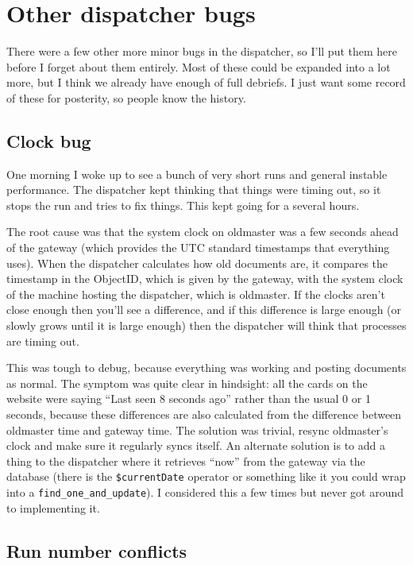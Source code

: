 \chapter{Other dispatcher bugs}

There were a few other more minor bugs in the dispatcher, so I'll put them here before I forget about them entirely.
Most of these could be expanded into a lot more, but I think we already have enough of full debriefs.
I just want some record of these for posterity, so people know the history.

\section{Clock bug}

One morning I woke up to see a bunch of very short runs and general instable performance.
The dispatcher kept thinking that things were timing out, so it stops the run and tries to fix things.
This kept going for a several hours.

The root cause was that the system clock on oldmaster was a few seconds ahead of the gateway (which provides the UTC standard timestamps that everything uses).
When the dispatcher calculates how old documents are, it compares the timestamp in the ObjectID, which is given by the gateway, with the system clock of the machine hosting the dispatcher, which is oldmaster.
If the clocks aren't close enough then you'll see a difference, and if this difference is large enough (or slowly grows until it is large enough) then the dispatcher will think that processes are timing out.

This was tough to debug, because everything was working and posting documents as normal.
The symptom was quite clear in hindsight: all the cards on the website were saying ``Last seen 8 seconds ago'' rather than the usual 0 or 1 seconds, because these differences are also calculated from the difference between oldmaster time and gateway time.
The solution was trivial, resync oldmaster's clock and make sure it regularly syncs itself.
An alternate solution is to add a thing to the dispatcher where it retrieves ``now'' from the gateway via the database (there is the \texttt{\$currentDate} operator or something like it you could wrap into a \texttt{find\_one\_and\_update}).
I considered this a few times but never got around to implementing it.

\section{Run number conflicts}

